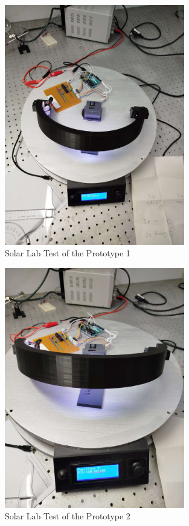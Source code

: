\begin{figure}[htbp]
    \centering
    \includegraphics[width=0.7\textwidth]{figures/methodology/Prototype_testing/solarLab_test1.jpg}
    \caption*{Solar Lab Test of the Prototype 1} 
    \label{fig:Solar-Lab-Test-Prototype1}
    \end{figure}

\begin{figure}[htbp]
        \centering
        \includegraphics[width=0.7\textwidth]{figures/methodology/Prototype_testing/solarLab_test2.jpg}
        \caption*{Solar Lab Test of the Prototype 2} 
        \label{fig:Solar-Lab-Test-Prototype2}
        \end{figure}

